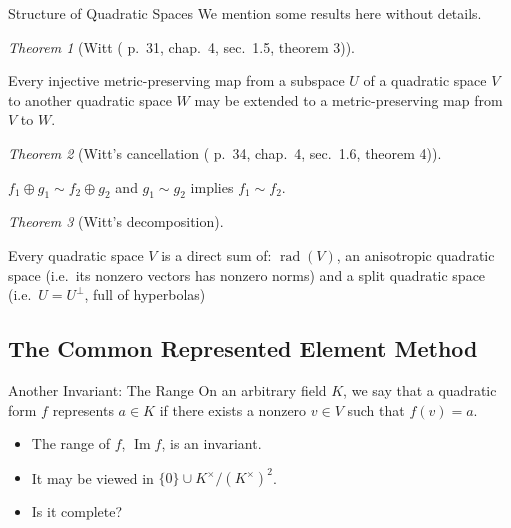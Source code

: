 \documentclass[fontset=fandol,envcountsect]{ctexbeamer}
\theoremstyle{theorem}
\newtheorem{theorem}{定理}
\theoremstyle{example}
\theoremstyle{remark}
\theoremstyle{theorem}
\newtheorem{theorem}{Theorem}
\theoremstyle{example}
\theoremstyle{remark}
\newcommand{\myemph}[1]{{\usebeamercolor[fg]{structure} #1}}
\renewcommand{\emph}{\myemph}
\begin{document}
\begin{frame}{Structure of Quadratic Spaces}
\label{structure-of-quadratic-spaces}
We mention some results here without details.

\begin{theorem}[Witt (\autocite{serre_course_1973} p.~31, chap.~4,
sec.~1.5, theorem 3)]\protect\hypertarget{thm-witt}{}\label{thm-witt}

Every injective metric-preserving map from a subspace \(U\) of a
quadratic space \(V\) to another quadratic space \(W\) may be extended
to a metric-preserving map from \(V\) to \(W\).

\end{theorem}

\begin{theorem}[Witt's cancellation (\autocite{serre_course_1973} p.~34,
chap.~4, sec.~1.6, theorem
4)]\protect\hypertarget{thm-witt-cancel}{}\label{thm-witt-cancel}

\(f_1 \oplus g_1 \sim f_2 \oplus g_2\) and \(g_1 \sim g_2\) implies
\(f_1 \sim f_2\).

\end{theorem}

\begin{theorem}[Witt's
decomposition]\protect\hypertarget{thm-witt-decomposition}{}\label{thm-witt-decomposition}

Every quadratic space \(V\) is a direct sum of:
\(\operatorname{rad}(V)\), an anisotropic quadratic space (i.e.~its
nonzero vectors has nonzero norms) and a split quadratic space
(i.e.~\(U = U^\perp\), full of hyperbolas)

\end{theorem}
\end{frame}

\subsection{The Common Represented Element
Method}\label{the-common-represented-element-method}

\begin{frame}{Another Invariant: The Range}
\label{another-invariant-the-range}
On an arbitrary field \(K\), we say that a quadratic form \(f\)
\emph{represent}s \(a \in K\) if there exists a nonzero \(v \in V\) such
that \(f(v) = a\).

\begin{itemize}
\item
  The range of \(f\), \(\operatorname{Im}f\), is an invariant.
\item
  It may be viewed in \(\{0\} \cup K^\times / (K^{\times})^2\).
\item
  Is it complete?
\end{itemize}
\end{frame}
\end{document}
